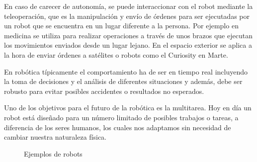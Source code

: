 En caso de carecer de autonomía, se puede interaccionar con el robot mediante la teleoperación, que es la manipulación y envío de órdenes para ser ejecutadas por un robot que se encuentra en un lugar diferente a la persona. Por ejemplo en medicina se utiliza para realizar operaciones a través de unos brazos que ejecutan los movimientos enviados desde un lugar lejano. En el espacio exterior se aplica a la hora de enviar órdenes a satélites o robots como el Curiosity en Marte.

En robótica típicamente el comportamiento ha de ser en tiempo real incluyendo la toma de decisiones y el análisis de diferentes situaciones y además, debe ser robusto para evitar posibles accidentes o resultados no esperados. %

Uno de los objetivos para el futuro de la robótica es la multitarea. Hoy en día un robot está diseñado para un número limitado de posibles trabajos o tareas, a diferencia de los seres humanos, los cuales nos adaptamos sin necesidad de cambiar nuestra naturaleza física.

\begin{figure}[hbtp]
	\centering
	\hspace{10mm}
	\caption{Ejemplos de robots}
	\label{FIG:1_robotica}
\end{figure}


